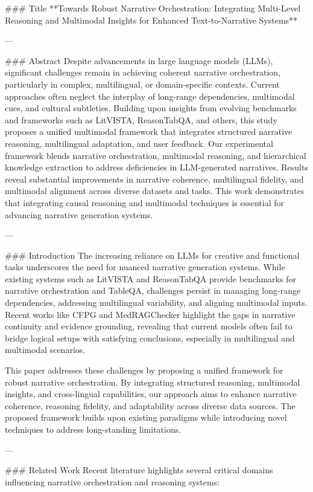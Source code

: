 ### Title
**Towards Robust Narrative Orchestration: Integrating Multi-Level Reasoning and Multimodal Insights for Enhanced Text-to-Narrative Systems**

---

### Abstract
Despite advancements in large language models (LLMs), significant challenges remain in achieving coherent narrative orchestration, particularly in complex, multilingual, or domain-specific contexts. Current approaches often neglect the interplay of long-range dependencies, multimodal cues, and cultural subtleties. Building upon insights from evolving benchmarks and frameworks such as LitVISTA, ReasonTabQA, and others, this study proposes a unified multimodal framework that integrates structured narrative reasoning, multilingual adaptation, and user feedback. Our experimental framework blends narrative orchestration, multimodal reasoning, and hierarchical knowledge extraction to address deficiencies in LLM-generated narratives. Results reveal substantial improvements in narrative coherence, multilingual fidelity, and multimodal alignment across diverse datasets and tasks. This work demonstrates that integrating causal reasoning and multimodal techniques is essential for advancing narrative generation systems.

---

### Introduction
The increasing reliance on LLMs for creative and functional tasks underscores the need for nuanced narrative generation systems. While existing systems such as LitVISTA and ReasonTabQA provide benchmarks for narrative orchestration and TableQA, challenges persist in managing long-range dependencies, addressing multilingual variability, and aligning multimodal inputs. Recent works like CFPG and MedRAGChecker highlight the gaps in narrative continuity and evidence grounding, revealing that current models often fail to bridge logical setups with satisfying conclusions, especially in multilingual and multimodal scenarios.

This paper addresses these challenges by proposing a unified framework for robust narrative orchestration. By integrating structured reasoning, multimodal insights, and cross-lingual capabilities, our approach aims to enhance narrative coherence, reasoning fidelity, and adaptability across diverse data sources. The proposed framework builds upon existing paradigms while introducing novel techniques to address long-standing limitations.

---

### Related Work
Recent literature highlights several critical domains influencing narrative orchestration and reasoning systems:

